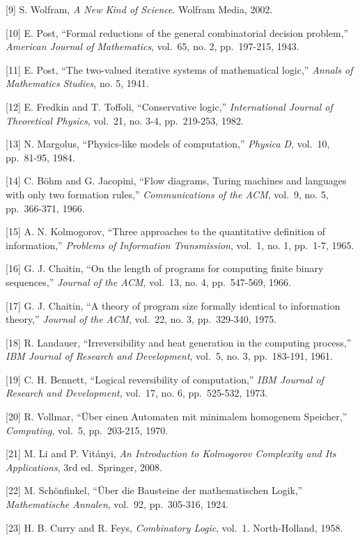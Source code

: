 \documentclass[
  11pt,
]{article}
\begin{document}
{[}9{]} S. Wolfram, \emph{A New Kind of Science}. Wolfram Media, 2002.

{[}10{]} E. Post, ``Formal reductions of the general combinatorial
decision problem,'' \emph{American Journal of Mathematics}, vol.~65, no.
2, pp.~197-215, 1943.

{[}11{]} E. Post, ``The two-valued iterative systems of mathematical
logic,'' \emph{Annals of Mathematics Studies}, no. 5, 1941.

{[}12{]} E. Fredkin and T. Toffoli, ``Conservative logic,''
\emph{International Journal of Theoretical Physics}, vol.~21, no. 3-4,
pp.~219-253, 1982.

{[}13{]} N. Margolus, ``Physics-like models of computation,''
\emph{Physica D}, vol.~10, pp.~81-95, 1984.

{[}14{]} C. B\"ohm and G. Jacopini, ``Flow diagrams, Turing machines and
languages with only two formation rules,'' \emph{Communications of the
ACM}, vol.~9, no. 5, pp.~366-371, 1966.

{[}15{]} A. N. Kolmogorov, ``Three approaches to the quantitative
definition of information,'' \emph{Problems of Information
Transmission}, vol.~1, no. 1, pp.~1-7, 1965.

{[}16{]} G. J. Chaitin, ``On the length of programs for computing finite
binary sequences,'' \emph{Journal of the ACM}, vol.~13, no. 4,
pp.~547-569, 1966.

{[}17{]} G. J. Chaitin, ``A theory of program size formally identical to
information theory,'' \emph{Journal of the ACM}, vol.~22, no. 3,
pp.~329-340, 1975.

{[}18{]} R. Landauer, ``Irreversibility and heat generation in the
computing process,'' \emph{IBM Journal of Research and Development},
vol.~5, no. 3, pp.~183-191, 1961.

{[}19{]} C. H. Bennett, ``Logical reversibility of computation,''
\emph{IBM Journal of Research and Development}, vol.~17, no. 6,
pp.~525-532, 1973.

{[}20{]} R. Vollmar, ``\"Uber einen Automaten mit minimalem homogenem
Speicher,'' \emph{Computing}, vol.~5, pp.~203-215, 1970.

{[}21{]} M. Li and P. Vit\'anyi, \emph{An Introduction to Kolmogorov
Complexity and Its Applications}, 3rd ed.~Springer, 2008.

{[}22{]} M. Sch\"onfinkel, ``\"Uber die Bausteine der mathematischen
Logik,'' \emph{Mathematische Annalen}, vol.~92, pp.~305-316, 1924.

{[}23{]} H. B. Curry and R. Feys, \emph{Combinatory Logic}, vol.~1.
North-Holland, 1958.
\end{document}
